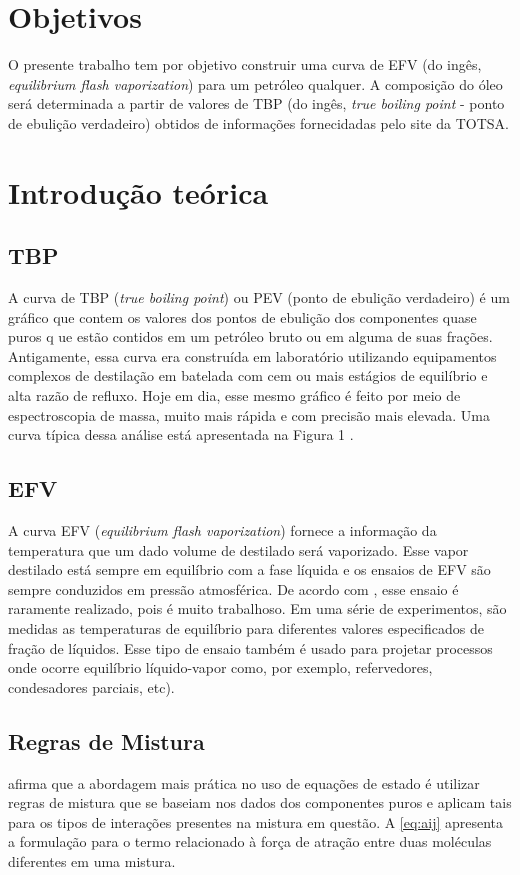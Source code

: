 \section{Objetivos}
O presente trabalho tem por objetivo construir uma curva de EFV (do
ingês, \emph{equilibrium flash vaporization}) para um petróleo qualquer. A
composição do óleo será determinada a partir de valores de TBP (do ingês,
\emph{true boiling point} - ponto de ebulição verdadeiro) obtidos de
informações fornecidadas pelo site da TOTSA.

\section{Introdução teórica}

\subsection{TBP}
A curva de TBP (\emph{true boiling point}) ou PEV (ponto de ebulição verdadeiro)
é um gráfico que contem os valores dos pontos de ebulição  dos componentes quase puros q
ue estão contidos em um petróleo bruto ou em alguma de suas frações. Antigamente, 
essa curva era construída em laboratório utilizando equipamentos complexos de 
destilação em batelada com cem ou mais estágios de equilíbrio e alta razão de 
refluxo. Hoje em dia, esse mesmo gráfico é feito por meio de espectroscopia de massa, 
muito mais rápida e com precisão mais elevada. Uma curva típica dessa análise está 
apresentada na Figura 1 \cite{Jones2006}.

\subsection{EFV}


A curva EFV (\emph{equilibrium flash vaporization}) fornece a informação da
temperatura que um dado volume de destilado será vaporizado. Esse vapor
destilado está sempre em equilíbrio com a fase líquida e os ensaios de EFV são
sempre conduzidos em pressão atmosférica. De acordo com ,
esse ensaio é raramente realizado, pois é muito trabalhoso. Em uma série de
experimentos, são medidas as temperaturas de equilíbrio para diferentes valores especificados de 
 fração de líquidos. Esse tipo de ensaio também é usado para projetar processos
 onde ocorre equilíbrio líquido-vapor como, por exemplo, refervedores, condesadores
  parciais, etc).

\subsection{Regras de Mistura}
 afirma que a abordagem mais prática no uso de equações de estado
é utilizar regras de mistura que se baseiam nos dados dos componentes puros e 
aplicam tais para os tipos de interações presentes na mistura em questão. A 
\autoref{eq:aij} apresenta a formulação para o termo relacionado à força de
atração entre duas moléculas diferentes em uma mistura.

